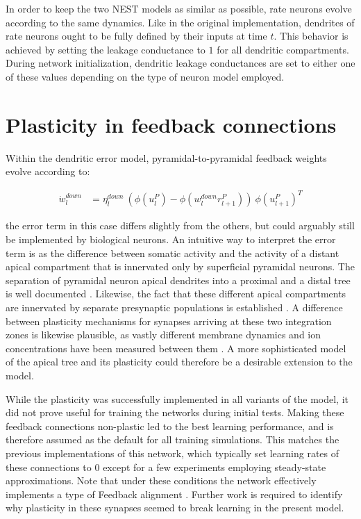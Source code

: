 In order to keep the two NEST models as similar as possible, rate neurons evolve according to the same dynamics. Like in
the original implementation, dendrites of rate neurons ought to be fully defined by their inputs at time $t$. This
behavior is achieved by setting the leakage conductance to $1$ for all dendritic compartments. During network
initialization, dendritic leakage conductances are set to either one of these values depending on the type of neuron
model employed.


\section{Plasticity in feedback connections}\label{sec-feedback-plast}

Within the dendritic error model, pyramidal-to-pyramidal feedback weights evolve according to:

\begin{align}
  \dot{w}_{l}^{down} & = \eta_l^{down} \ ( \phi(u_l^{P}) - \phi(w_l^{down} r_{l+1}^P) )\ \phi(u_{l+1}^{P})^T
\end{align}

the error term in this case differs slightly from the others, but could arguably still be implemented by biological
neurons. An intuitive way to interpret the error term is as the difference between somatic activity and the activity of
a distant apical compartment that is innervated only by superficial pyramidal neurons. The separation of pyramidal
neuron apical dendrites into a proximal and a distal tree is well documented \citep{Ishizuka1995}. Likewise, the fact
that these different apical compartments are innervated by separate presynaptic populations is established
\citep{Larkum2018}. A difference between plasticity mechanisms for synapses arriving at these two integration zones is
likewise plausible, as vastly different membrane dynamics and ion concentrations have been measured between them
\citep{Ishizuka1995,Larkum2009}. A more sophisticated model of the apical tree and its plasticity could therefore be a
desirable extension to the model.

While the plasticity was successfully implemented in all variants of the model, it did not prove useful for training the
networks during initial tests. Making these feedback connections non-plastic led to the best learning performance, and
is therefore assumed as the default for all training simulations. This matches the previous implementations of this
network, which typically set learning rates of these connections to $0$ except for a few experiments employing
steady-state approximations. Note that under these conditions the network effectively implements a type of Feedback
alignment \citep{Lillicrap2014}. Further work is required to identify why plasticity in these synapses seemed to break
learning in the present model.

